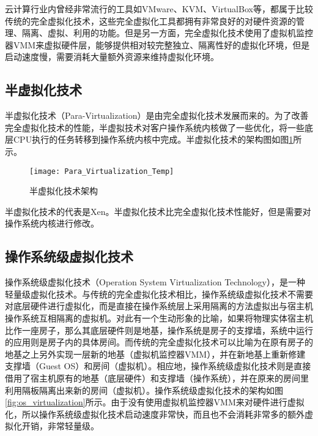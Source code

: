 云计算行业内曾经非常流行的工具如VMware\citep{sahasrabudhe2014comparing,li2010selecting}、KVM\citep{liu2014research}、VirtualBox\citep{li2010selecting}等，都属于比较传统的完全虚拟化技术，这些完全虚拟化工具都拥有非常良好的对硬件资源的管理、隔离、虚拟、利用的功能。但是另一方面，完全虚拟化技术使用了虚拟机监控器VMM来虚拟硬件层，能够提供相对较完整独立、隔离性好的虚拟化环境，但是启动速度慢，需要消耗大量额外资源来维持虚拟化环境。

\subsection{半虚拟化技术}

半虚拟化技术（Para-Virtualization）是由完全虚拟化技术发展而来的。为了改善完全虚拟化技术的性能，半虚拟技术对客户操作系统内核做了一些优化，将一些底层CPU执行的任务转移到操作系统内核中完成。半虚拟化技术的架构图如图\ref{fig:para_virtualization}所示\cite{2008半虚拟化技术分析与研究}。

\begin{figure}[!htbp]
    \centering
    \texttt{[image: Para\_Virtualization\_Temp]}
    \caption{半虚拟化技术架构}
    \label{fig:para_virtualization}
\end{figure}

半虚拟化技术的代表是Xen\cite{barham2003xen}。半虚拟化技术比完全虚拟化技术性能好，但是需要对操作系统内核进行修改。

\subsection{操作系统级虚拟化技术}

操作系统级虚拟化技术（Operation System Virtualization Technology），是一种轻量级虚拟化技术\citep{morabito2017virtualization}。与传统的完全虚拟化技术相比，操作系统级虚拟化技术不需要对底层硬件进行虚拟化，而是直接在操作系统层上采用隔离的方法虚拟出与宿主机操作系统互相隔离的虚拟机。对此有一个生动形象的比喻，如果将物理实体宿主机比作一座房子，那么其底层硬件则是地基，操作系统是房子的支撑墙，系统中运行的应用则是房子内的具体房间。而传统的完全虚拟化技术可以比喻为在原有房子的地基之上另外实现一层新的地基（虚拟机监控器VMM），并在新地基上重新修建支撑墙（Guest OS）和房间（虚拟机）。相应地，操作系统级虚拟化技术则是直接借用了宿主机原有的地基（底层硬件）和支撑墙（操作系统），并在原来的房间里利用隔板隔离出来新的房间（虚拟机）。操作系统级虚拟化技术的架构如图\ref{fig:os_virtualization}所示\citep{xavier2013performance}。由于没有使用虚拟机监控器VMM来对硬件进行虚拟化，所以操作系统级虚拟化技术启动速度非常快，而且也不会消耗非常多的额外虚拟化开销，非常轻量级\citep{babu2014system}。

